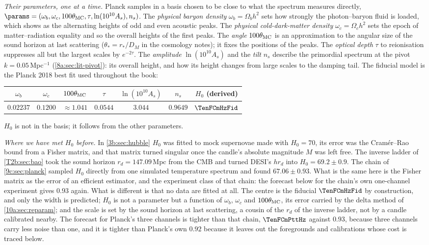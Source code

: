 \emph{Their parameters, one at a time.} Planck samples in a basis chosen to be close to what the spectrum
measures directly, $\params=(\omega_b,\omega_c,100\theta_{\rm MC},\tau,\ln(10^{10}A_s),n_s)$.
The \emph{physical baryon density} $\omega_b=\Omega_bh^2$ sets how strongly the photon--baryon fluid is loaded, which
shows as the alternating heights of odd and even acoustic peaks. The \emph{physical cold-dark-matter density}
$\omega_c=\Omega_ch^2$ sets the epoch of matter--radiation equality and so the overall heights of the first peaks.
The \emph{angle} $100\theta_{\rm MC}$ is an approximation to the angular size of the sound horizon at last scattering
($\theta_*=r_*/D_M$ in the cosmology notes); it fixes the positions of the peaks. The \emph{optical depth} $\tau$ to
reionisation suppresses all but the largest scales by $e^{-2\tau}$. The \emph{amplitude} $\ln(10^{10}A_s)$ and the
\emph{tilt} $n_s$ describe the primordial spectrum at the pivot $k=0.05\,$Mpc$^{-1}$ (\cref{8a:sec:lit-pivot}): its overall
height, and how its height changes from large scales to the damping tail. The fiducial model is the Planck 2018
best fit used throughout the book:
\begin{center}
\small
\renewcommand{\arraystretch}{1.15}
\begin{tabular}{@{}cccccc|c@{}}
\toprule
$\omega_b$ & $\omega_c$ & $100\theta_{\rm MC}$ & $\tau$ & $\ln(10^{10}A_s)$ & $n_s$ & $H_0$ (derived)\\\midrule
$0.02237$ & $0.1200$ & $\approx1.041$ & $0.0544$ & $3.044$ & $0.9649$ & $\TenFCmHzFid$\\
\bottomrule
\end{tabular}
\end{center}
$H_0$ is not in the basis; it follows from the other parameters.

\emph{Where we have met $H_0$ before.} In \cref{3b:sec:hubble} $H_0$ was fitted to mock supernovae made with $H_0=70$, its error was the Cram\'er--Rao bound from a Fisher matrix, and that matrix turned singular once the candle's absolute magnitude $M$ was left free. The inverse ladder of \cref{T2b:sec:bao} took the sound horizon $r_d=147.09$\,Mpc from the CMB and turned DESI's $hr_d$ into $H_0=69.2\pm0.9$. The chain of \cref{9c:sec:planck} sampled $H_0$ directly from one simulated temperature spectrum and found $67.06\pm0.93$. What is the same here is the Fisher matrix as the error of an efficient estimator, and the experiment class of that chain: the forecast below for the chain's own one-channel experiment gives $0.93$ again. What is different is that no data are fitted at all. The centre is the fiducial $\TenFCmHzFid$ by construction, and only the width is predicted; $H_0$ is not a parameter but a function of $\omega_b$, $\omega_c$ and $100\theta_{\rm MC}$, its error carried by the delta method of \cref{10a:sec:reparam}; and the scale is set by the sound horizon at last scattering, a cousin of the $r_d$ of the inverse ladder, not by a candle calibrated nearby. The forecast for Planck's three channels is tighter than that chain, $\TenFCmPttHz$ against $0.93$, because three channels carry less noise than one, and it is tighter than Planck's own $0.92$ because it leaves out the foregrounds and calibrations whose cost is traced below.

